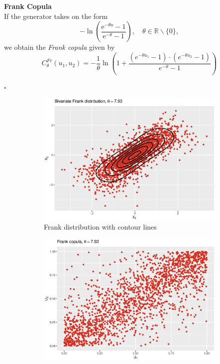 \textbf{Frank Copula}\\
If the generator takes on the form
\begin{equation}
-\ln \left(\frac{\mathrm{e}^{-\theta u}-1}{\mathrm{e}^{-\theta}-1}\right), \quad \theta \in \mathbb{R} \backslash\{0\},
\end{equation}
we obtain the \textit{Frank copula} given by
\begin{equation}
C_{\theta}^{F r}\left(u_{1}, u_{2}\right)=-\frac{1}{\theta} \ln \left(1+\frac{\left(e^{-\theta u_{1}}-1\right) \cdot\left(e^{-\theta u_{2}}-1\right)}{e^{-\theta}-1}\right)
\end{equation}

\hfill $\square$ \\



 \begin{figure}[H]
\centering
\begin{subfigure}{.45\textwidth}
  \centering
  \includegraphics[width=\linewidth]{figures/bivariate_frank.eps}
  \caption{Frank distribution with contour lines}
  \label{fig:bivariate_frank}
\end{subfigure}
\begin{subfigure}{.45\textwidth}
  \centering
  \includegraphics[width=\linewidth]{figures/frank_copula.eps}

\end{subfigure}
\end{figure}
